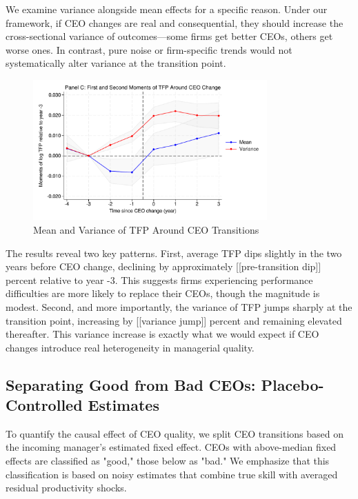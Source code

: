 \documentclass[11pt,a4paper]{article}
\begin{document}
We examine variance alongside mean effects for a specific reason. Under our framework, if CEO changes are real and consequential, they should increase the cross-sectional variance of outcomes—some firms get better CEOs, others get worse ones. In contrast, pure noise or firm-specific trends would not systematically alter variance at the transition point.

\begin{figure}[htbp]
\centering
\includegraphics[width=0.8\textwidth]{figure/event_study_panel_c.pdf}
\caption{Mean and Variance of TFP Around CEO Transitions}
\label{fig:event_study_combined}
\end{figure}

The results reveal two key patterns. First, average TFP dips slightly in the two years before CEO change, declining by approximately [[pre-transition dip]] percent relative to year -3. This suggests firms experiencing performance difficulties are more likely to replace their CEOs, though the magnitude is modest. Second, and more importantly, the variance of TFP jumps sharply at the transition point, increasing by [[variance jump]] percent and remaining elevated thereafter. This variance increase is exactly what we would expect if CEO changes introduce real heterogeneity in managerial quality.

\subsection{Separating Good from Bad CEOs: Placebo-Controlled Estimates}

To quantify the causal effect of CEO quality, we split CEO transitions based on the incoming manager's estimated fixed effect. CEOs with above-median fixed effects are classified as "good," those below as "bad." We emphasize that this classification is based on noisy estimates that combine true skill with averaged residual productivity shocks.
\end{document}
